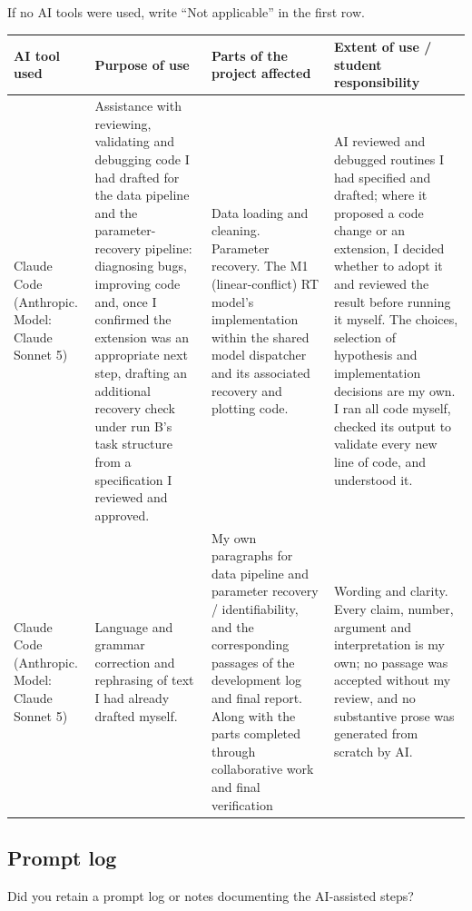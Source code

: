 \documentclass[11pt]{article}
\begin{document}
If no AI tools were used, write ``Not applicable'' in the first row.

\medskip

\begin{tabularx}{\textwidth}{|
>{\raggedright\arraybackslash}X|
>{\raggedright\arraybackslash}X|
>{\raggedright\arraybackslash}X|
>{\raggedright\arraybackslash}X|}
\hline
\textbf{AI tool used} &
\textbf{Purpose of use} &
\textbf{Parts of the project affected} &
\textbf{Extent of use / student responsibility} \\
\hline
Claude Code (Anthropic. Model: Claude Sonnet 5) &
Assistance with reviewing, validating and debugging code I had drafted for the data
pipeline and the parameter-recovery pipeline: diagnosing bugs, improving code and, once I confirmed the extension was an appropriate next step, drafting an additional recovery check under run B's task structure from a specification I
reviewed and approved. &
Data loading and cleaning. Parameter recovery. The M1
(linear-conflict) RT model's implementation within the shared model dispatcher and its associated recovery and plotting code. &
AI reviewed and debugged routines I had specified and drafted; where it proposed a
code change or an extension, I decided whether to adopt it and reviewed the result before running it myself. The choices, selection of hypothesis and implementation decisions are my own. I ran all code
myself, checked its output to validate every new line of code, and understood it. \\
[2.5em]
\hline
Claude Code (Anthropic. Model: Claude Sonnet 5) &
Language and grammar correction and rephrasing of text I had already drafted
myself. &
My own paragraphs for data pipeline and parameter recovery /
identifiability, and the corresponding passages of the development log and final report. Along with the parts completed through collaborative work and final verification &
Wording and clarity. Every claim, number, argument and interpretation is my
own; no passage was accepted without my review, and no substantive prose was
generated from scratch by AI. \\
[2.5em]
\hline
\end{tabularx}

\bigskip

\subsection*{Prompt log}

\noindent
Did you retain a prompt log or notes documenting the AI-assisted steps?
\end{document}
